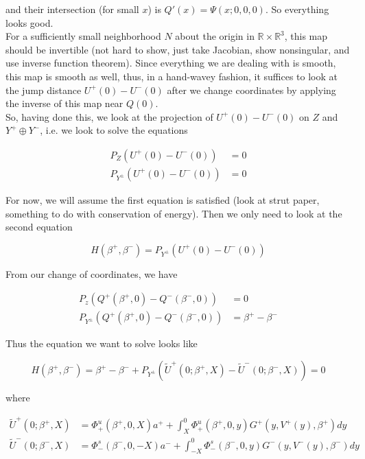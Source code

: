 \documentclass[12pt]{article}
\def\R{{\mathbb R}}
\begin{document}
and their intersection (for small $x$) is $Q'(x) = \Psi(x; 0, 0, 0)$. So everything looks good.\\

For a sufficiently small neighborhood $N$ about the origin in $\R \times \R^3$, this map should be invertible (not hard to show, just take Jacobian, show nonsingular, and use inverse function theorem). Since everything we are dealing with is smooth, this map is smooth as well, thus, in a hand-wavey fashion, it suffices to look at the jump distance $U^+(0) - U^-(0)$ after we change coordinates by applying the inverse of this map near $Q(0)$.
\\

So, having done this, we look at the projection of $U^+(0) - U^-(0)$ on $Z$ and $Y^+ \oplus Y^-$, i.e. we look to solve the equations

\begin{align*}
P_Z(U^+(0) - U^-(0)) &= 0 \\
P_{Y^\pm}(U^+(0) - U^-(0)) &= 0
\end{align*}

For now, we will assume the first equation is satisfied (look at strut paper, something to do with conservation of energy). Then we only need to look at the second equation

\begin{equation}
H(\beta^+, \beta^-) = P_{Y^\pm}(U^+(0) - U^-(0))
\end{equation}

From our change of coordinates, we have

\begin{align*}
P_z(Q^+(\beta^+, 0) - Q^-(\beta^-, 0)) &= 0 \\
P_{Y^\pm}(Q^+(\beta^+, 0) - Q^-(\beta^-, 0)) &= \beta^+ - \beta^-
\end{align*}

Thus the equation we want to solve looks like

\begin{equation}
H(\beta^+, \beta^-) = 
\beta^+ - \beta^- + P_{Y^\pm}(\tilde{U}^+(0; \beta^+, X) - \tilde{U}^-(0; \beta^-, X)) = 0
\end{equation}

where

\begin{align*}
\tilde{U}^+(0; \beta^+, X) &= \Phi^u_+(\beta^+, 0, X) a^+ + \int_{X}^0 \Phi_+^u(\beta^+, 0, y) G^+(y, V^+(y),\beta^+) dy \\ 
\tilde{U}^-(0; \beta^-, X) &= \Phi^s_-(\beta^-, 0, -X) a^- + \int_{-X}^0 \Phi_-^s(\beta^-, 0, y) G^-(y, V^-(y),\beta^-) dy 
\end{align*}
\end{document}
